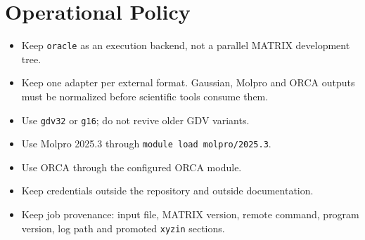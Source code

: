 \documentclass[11pt]{article}
\newcommand{\host}{\texttt{oracle}}
\newcommand{\xyzin}{\texttt{xyzin}}
\begin{document}
\section{Operational Policy}

\begin{itemize}
  \item Keep \host{} as an execution backend, not a parallel MATRIX
        development tree.
  \item Keep one adapter per external format.  Gaussian, Molpro and ORCA
        outputs must be normalized before scientific tools consume them.
  \item Use \texttt{gdv32} or \texttt{g16}; do not revive older GDV variants.
  \item Use Molpro 2025.3 through \texttt{module load molpro/2025.3}.
  \item Use ORCA through the configured ORCA module.
  \item Keep credentials outside the repository and outside documentation.
  \item Keep job provenance: input file, MATRIX version, remote command,
        program version, log path and promoted \xyzin{} sections.
\end{itemize}
\end{document}
